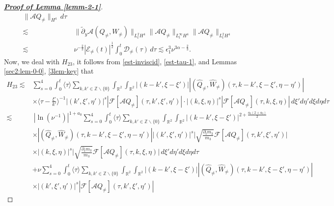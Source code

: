 \documentclass[11pt,reqno]{article}
\numberwithin{equation}{section}
\newcommand\R{{\mathbb R}}
\newcommand\Z{{\mathbb Z}}
\newcommand\D{{\mathcal D}}
\newcommand\F{{\mathcal F}}
\newcommand\E{{\mathcal E}}
\newcommand\A{\mathcal{A}}
\let\pa=\partial
\let\al=\alpha
\let\f=\frac
\let\ep=\epsilon
\begin{document}
\begin{proof}[\underline{\textbf{Proof of Lemma \ref{lemm-2-1}}}]
\begin{align*}
	\|\A Q_{\not=}\|_{H^4}\,d\tau
	\\
	\lesssim&~
	\|\tilde{\pa}_{y} \A(Q_{\not=},W_{\not=})\|_{L^2_tH^4}
	\|\A Q_{\not=}\|_{L^\infty_tH^4}
	\|\A Q_{\not=}\|_{L^2_tH^4}
	\\
	\lesssim&~ \nu^{-\f23} |\E_{\not=}(t)|^{\f12} \int_0^t\D_{\not=}(\tau)\,d\tau
	\lesssim  \ep_1^3\nu^{3\al-\f23}.
\end{align*}
Now, we deal with $H_{23}$, it follows from \eqref{est-inviscid}, \eqref{est-tau-1}, and Lemmas \ref{sec2:lem-0-0}, \ref{3lem-key} that
\begin{align*}
	H_{23}
	\lesssim &\sum_{s=0}^{4}
	\int_0^t \langle\tau\rangle
	\sum_{k,k'\in\Z\backslash\{0\}}\int_{\R^2}\int_{\R^2} 
	|(k-k',\xi-\xi')||(\hat{Q}_{\not=},\hat{W}_{\not=})(\tau,k-k',\xi-\xi',\eta-\eta')|
	\\
	&\times \langle \tau-\f{\xi'}{k'}\rangle^{-1} 
	|(k',\xi',\eta')|^{s}
	|\F[\A Q_{\not=}](\tau,k',\xi',\eta')|
	\cdot|(k,\xi,\eta)|^{s}
	|\F[\A Q_{\not=}](\tau,k,\xi,\eta)|\,d\xi' d\eta' d\xi d\eta d\tau
	\\
	\lesssim&~ |\ln(\nu^{-1})|^{1+a_0}
	\sum_{s=0}^{4}
	\int_0^t \langle\tau\rangle
	\sum_{k,k'\in\Z\backslash\{0\}}\int_{\R^2}\int_{\R^2} 
	|(k-k',\xi-\xi')|^{2+\f{a_0(2+a_0)}{2}}
	\\
	&\times
	|(\hat{Q}_{\not=},\hat{W}_{\not=})(\tau,k-k',\xi-\xi',\eta-\eta')|
	|(k',\xi',\eta')|^{s}
	\bigg|\sqrt{\f{\pa_t m_3}{m_3}}\F[\A Q_{\not=}](\tau,k',\xi',\eta')\bigg|
	\\
	&\times 
	|(k,\xi,\eta)|^{s}
	\bigg|\sqrt{\f{\pa_t m_3}{m_3}}\F[\A Q_{\not=}](\tau,k,\xi,\eta)\bigg|\,d\xi' d\eta' d\xi d\eta d\tau
	\\
	&+
	\nu \sum_{s=0}^{4} \int_0^t \langle\tau\rangle
	\sum_{k,k'\in\Z\backslash\{0\}}\int_{\R^2}\int_{\R^2} 
	|(k-k',\xi-\xi')||(\hat{Q}_{\not=},\hat{W}_{\not=})(\tau,k-k',\xi-\xi',\eta-\eta')|
	\\
	&\times 
	|(k',\xi',\eta')|^{s}
	|\F[\A Q_{\not=}](\tau,k',\xi',\eta')|

\end{align*}
\end{proof}
\end{document}
